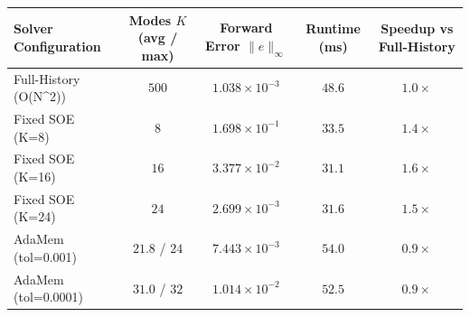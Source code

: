 \begin{tabular}{lcccc}
\toprule
\textbf{Solver Configuration} & \textbf{Modes $K$ (avg / max)} & \textbf{Forward Error $\|e\|_\infty$} & \textbf{Runtime (ms)} & \textbf{Speedup vs Full-History} \\
\midrule
Full-History (O(N^2)) & $500$ & $1.038 \times 10^{-3}$ & $48.6$ & $1.0\times$ \\
Fixed SOE (K=8) & $8$ & $1.698 \times 10^{-1}$ & $33.5$ & $1.4\times$ \\
Fixed SOE (K=16) & $16$ & $3.377 \times 10^{-2}$ & $31.1$ & $1.6\times$ \\
Fixed SOE (K=24) & $24$ & $2.699 \times 10^{-3}$ & $31.6$ & $1.5\times$ \\
AdaMem (tol=0.001) & $21.8$ / $24$ & $7.443 \times 10^{-3}$ & $54.0$ & $0.9\times$ \\
AdaMem (tol=0.0001) & $31.0$ / $32$ & $1.014 \times 10^{-2}$ & $52.5$ & $0.9\times$ \\
\bottomrule
\end{tabular}